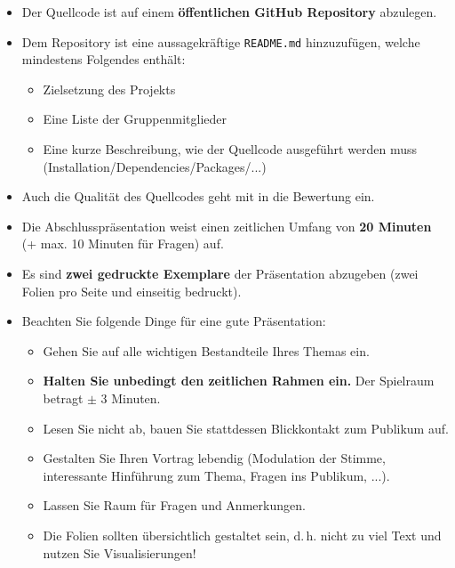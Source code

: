 \begin{frame}
	\begin{itemize}
		\item Der Quellcode ist auf einem \textbf{öffentlichen GitHub Repository} abzulegen.
		\item Dem Repository ist eine aussagekräftige \texttt{README.md} hinzuzufügen, welche mindestens Folgendes enthält:
		\begin{itemize}
			\item Zielsetzung des Projekts
			\item Eine Liste der Gruppenmitglieder
			\item Eine kurze Beschreibung, wie der Quellcode ausgeführt werden muss (Installation/Dependencies/Packages/...)
		\end{itemize}
		\item Auch die Qualität des Quellcodes geht mit in die Bewertung ein.
	\end{itemize}
	
\end{frame}


\begin{frame}
	\begin{itemize}
		\item Die Abschlusspräsentation weist einen zeitlichen Umfang von \textbf{20 Minuten} (+ max. 10 Minuten für Fragen) auf.
		\item Es sind \textbf{zwei gedruckte Exemplare} der Präsentation abzugeben (zwei Folien pro Seite und einseitig bedruckt).
		\item Beachten Sie folgende Dinge für eine gute Präsentation:
		\begin{itemize}
			\item Gehen Sie auf alle wichtigen Bestandteile Ihres Themas ein.
			\item \textbf{Halten Sie unbedingt den zeitlichen Rahmen ein.} Der Spielraum betragt $\pm$ 3 Minuten.
			\item Lesen Sie nicht ab, bauen Sie stattdessen Blickkontakt zum Publikum auf.
			\item Gestalten Sie Ihren Vortrag lebendig (Modulation der Stimme, interessante Hinführung zum Thema, Fragen ins Publikum, ...).
			\item Lassen Sie Raum für Fragen und Anmerkungen.
			\item Die Folien sollten übersichtlich gestaltet sein, d.\,h. nicht zu viel Text und nutzen Sie Visualisierungen!
		\end{itemize}
	\end{itemize}
\end{frame}


